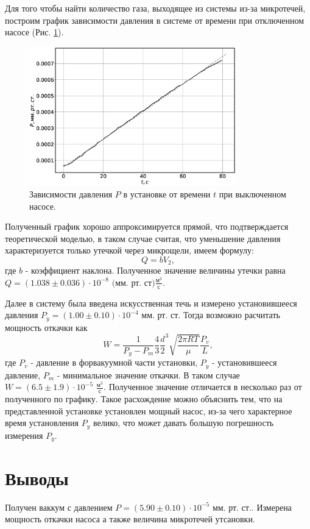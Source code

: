 \documentclass[12pt]{article}
\begin{document}
Для того чтобы найти количество газа, выходящее из системы из-за микротечей, построим график зависимости 
давления в системе от времени при отключенном насосе (Рис. \ref{fig:Pupt}). 

\begin{figure}[H]
    \centering
    \includegraphics[width=0.8\textwidth]{Pupt.eps}
    \caption{Зависимости давления $P$ в установке от времени $t$ при выключенном насосе.}
    \label{fig:Pupt}
\end{figure}

Полученный график хорошо аппроксимируется прямой, что подтверждается теоретической моделью, 
в таком случае считая, что уменьшение давления характеризуется только утечкой через микрощели, имеем формулу: 
\[
    Q = b V_2,
\]
где $b$ - коэффициент наклона. Полученное значение величины утечки равна 
$Q = (1.038 \pm 0.036) \cdot 10 ^ {-8}$ $\text{(мм. рт. ст)} \frac{\text{м}^3}{\text{с}}$.    

Далее в систему была введена искусственная течь и измерено установившееся давления $P_y = (1.00 \pm 0.10) \cdot 10 ^ {-4}$ $\text{мм. рт. ст}$. 
Тогда возможно расчитать мощность откачки как 
\[
    W = \frac{1}{P_y - P_m} \frac{4}{3} \frac{d}{2}^3 \sqrt{\frac{2\pi RT}{\mu}} \frac{P_v}{L}, 
\]  
где $P_v$ - давление в форвакуумной части установки, $P_y$ - установившееся давление, $P_m$ - 
минимальное значение откачки. В таком случае $W = (6.5 \pm 1.9) \cdot 10 ^ {-5}$ $\frac{\text{м}^3}{\text{с}}$. 
Полученное значение отличается в несколько раз от полученного по графику. Такое расхождение 
можно объяснить тем, что на представленной установке установлен мощный насос, из-за 
чего характерное время установления $P_y$ велико, что может давать большую погрешность измерения 
$P_y$.      

\section{Выводы}
Получен ваккум с давлением $P = (5.90 \pm 0.10) \cdot 10 ^ {-5}$ $\text{мм. рт. ст.}$. Измерена мощность откачки насоса а также 
величина микротечей утсановки.  
\end{document}
